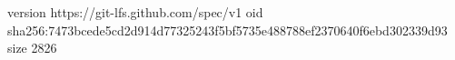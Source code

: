 version https://git-lfs.github.com/spec/v1
oid sha256:7473bcede5cd2d914d77325243f5bf5735e488788ef2370640f6ebd302339d93
size 2826
